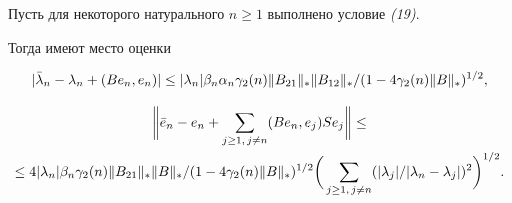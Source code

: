 \begin{thmnonum}


Пусть для некоторого натурального $n\ge 1$ выполнено условие {\em (19)}.


Тогда имеют место оценки


\begin{equation}


|\Bar\lambda_n-\lambda_n+(Be_n,e_n)|\le |\lambda_n|


\beta_n\alpha_n\gamma_2(n)\|B_{21}\|_*\|B_{12}\|_*/


(1-4\gamma_2(n)\|B\|_*)^{1/2},


\end{equation}


\begin{multline}


\biggl\| \Bar e_n-e_n+\sum_{j\ge 1,\,j\ne n}(Be_n,e_j)Se_j\biggr\| \le\\


%


\le 4|\lambda_n|\beta_n\gamma_2(n)\|B_{21}\|_*\|B\|_*/


(1-4\gamma_2(n)\|B\|_*)^{1/2}\biggl(\,


\sum_{j\ge 1,\,j\ne n}(|\lambda_j|/|\lambda_n-\lambda_j|)^2


\biggr)^{1/2}.


\end{multline}


\end{thmnonum}






